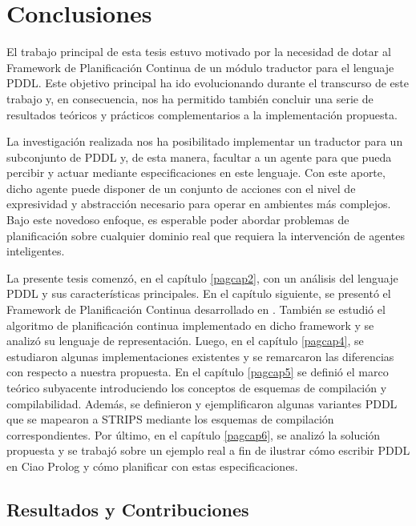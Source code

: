
\chapter{Conclusiones} \label{pagcap7}

El trabajo principal de esta tesis estuvo motivado por la necesidad de dotar
al Framework de Planificaci\'on Continua de un m\'odulo traductor
para el lenguaje PDDL. Este objetivo principal ha ido evolucionando durante el transcurso de
este trabajo y, en consecuencia, nos ha 
permitido tambi\'en concluir una serie de resultados te\'oricos y
pr\'acticos complementarios a la implementaci\'on
propuesta.

La investigaci\'on realizada nos ha posibilitado
implementar un traductor para un subconjunto
de PDDL y, de esta manera, facultar a un agente para que pueda percibir y actuar mediante
especificaciones en este lenguaje. Con este aporte, dicho agente puede disponer de un conjunto de acciones con
el nivel de expresividad y abstracci\'on necesario para operar en ambientes m\'as
complejos. Bajo este novedoso enfoque, es esperable poder abordar
problemas de planificaci\'on sobre cualquier dominio real
que requiera la intervenci\'on de agentes inteligentes. 

La presente tesis comenz\'o, en el cap\'itulo \ref{pagcap2}, con un an\'alisis del lenguaje
PDDL y sus caracter\'isticas principales. En el cap\'itulo siguiente, se present\'o el Framework de
Planificaci\'on Continua desarrollado en \cite{gbraun:tesisMarioMoya}. Tambi\'en se
estudi\'o el algoritmo de planificaci\'on continua implementado en
dicho framework y se analiz\'o su lenguaje de representaci\'on. 
Luego, en el cap\'itulo \ref{pagcap4}, se es\-tu\-dia\-ron algunas implementaciones existentes
y se remarcaron las diferencias con respecto a nuestra propuesta. En el cap\'itulo \ref{pagcap5} se
defini\'o el marco te\'orico subyacente introduciendo los conceptos de
esquemas de compilaci\'on y compilabilidad. Adem\'as, se
definieron y ejemplificaron algunas va\-rian\-tes PDDL que se mapearon a
STRIPS mediante los esquemas de compilaci\'on correspondientes. Por \'ultimo, en el
cap\'itulo \ref{pagcap6}, se analiz\'o la soluci\'on propuesta
y se trabaj\'o sobre un ejemplo real a fin de ilustrar c\'omo escribir
PDDL en Ciao Prolog y c\'omo planificar con estas especificaciones.


\section{Resultados y Contribuciones}

